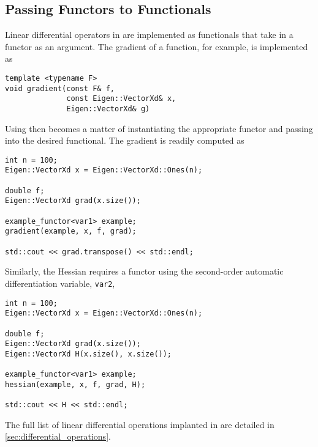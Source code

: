 \subsection{Passing Functors to Functionals}

Linear differential operators in \nomad are implemented as functionals that 
take in a functor as an argument.  The gradient of a function, for example,
is implemented as
%
\begin{verbatim}
template <typename F>
void gradient(const F& f,
              const Eigen::VectorXd& x,
              Eigen::VectorXd& g)
\end{verbatim}

Using \nomad then becomes a matter of instantiating the appropriate
functor and passing into the desired functional.  The gradient is readily
computed as
%
\begin{verbatim}
int n = 100;
Eigen::VectorXd x = Eigen::VectorXd::Ones(n);
  
double f;
Eigen::VectorXd grad(x.size());
  
example_functor<var1> example;
gradient(example, x, f, grad);

std::cout << grad.transpose() << std::endl;
\end{verbatim}
%
Similarly, the Hessian requires a functor using the second-order automatic
differentiation variable, \verb|var2|,
\begin{verbatim}
int n = 100;
Eigen::VectorXd x = Eigen::VectorXd::Ones(n);
  
double f;
Eigen::VectorXd grad(x.size());
Eigen::VectorXd H(x.size(), x.size());
  
example_functor<var1> example;
hessian(example, x, f, grad, H);

std::cout << H << std::endl;
\end{verbatim}
%
The full list of linear differential operations implanted in \nomad are detailed 
in \ref{sec:differential_operations}.

